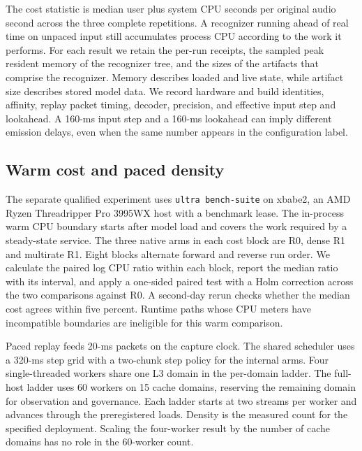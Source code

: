 \documentclass[conference]{IEEEtran}
\begin{document}
The cost statistic is median user plus system CPU seconds per original
audio second across the three complete repetitions. A recognizer running
ahead of real time on unpaced input still accumulates process CPU according
to the work it performs. For each result we retain the per-run receipts,
the sampled peak resident memory of the recognizer tree, and the sizes of
the artifacts that comprise the recognizer. Memory describes loaded and live
state, while artifact size describes stored model data. We record hardware
and build identities, affinity, replay packet timing, decoder, precision, and
effective input step and lookahead. A 160-ms input step and a 160-ms
lookahead can imply different emission delays, even when the same number
appears in the configuration label.

\subsection{Warm cost and paced density}

The separate qualified experiment uses \texttt{ultra bench-suite} on
xbabe2, an AMD Ryzen Threadripper Pro 3995WX host with a benchmark lease.
The in-process warm CPU boundary starts after model load and covers the
work required by a steady-state service. The three native arms in each cost
block are R0, dense R1 and multirate R1. Eight blocks alternate forward and
reverse run order. We calculate the paired log CPU ratio within each block,
report the median ratio with its interval, and apply a one-sided paired
test with a Holm correction across the two comparisons against R0. A
second-day rerun checks whether the median cost agrees within five percent.
Runtime paths whose CPU meters have incompatible boundaries are ineligible
for this warm comparison.

Paced replay feeds 20-ms packets on the capture clock. The shared scheduler
uses a 320-ms step grid with a two-chunk step policy for the internal arms.
Four single-threaded workers share one L3 domain in the per-domain ladder.
The full-host ladder uses 60 workers on 15 cache domains, reserving the
remaining domain for observation and governance. Each ladder starts at
two streams per worker and advances through the preregistered loads. Density
is the measured count for the specified deployment. Scaling the four-worker
result by the number of cache domains has no role in the 60-worker count.
\end{document}
